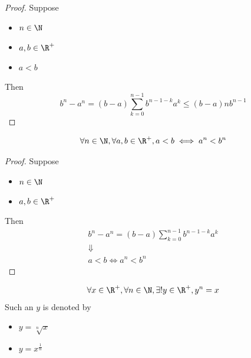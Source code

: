 \begin{proof}
  Suppose
  \begin{itemize}
    \item $n \in \N$
    \item $a, b \in \R^{+}$
    \item $ a < b$
  \end{itemize}
  Then
  \[
    b^{n} - a^{n} = (b - a)\sum_{k = 0}^{n - 1} b^{n - 1 - k} a^{k} \leq (b - a)nb^{n - 1}
  \]
\end{proof}

\bigskip

\begin{lemma} \label{an:lem:nth-power-is-monotone}
  \[
    \forall n \in \N, \forall a, b \in \R^{+}, a < b \iff a^{n} < b^{n}
  \]
\end{lemma}

\begin{proof}
  Suppose
  \begin{itemize}
    \item $n \in \N$
    \item $a, b \in \R^{+}$
  \end{itemize}
  Then
  \[
    \begin{array}{c}
      b^{n} - a^{n} = (b - a)\sum_{k = 0}^{n - 1} b^{n - 1 - k} a^{k} \\
      \Downarrow                                                      \\
      a < b \iff a^{n} < b^{n}
    \end{array}
  \]
\end{proof}

\bigskip

\begin{theorem} \label{an:thm:existence-and-uniqueness-of-nth-roots}
  \[
    \forall x \in \R^{+}, \forall n \in \N, \exists! y \in \R^{+}, y^{n} = x
  \]
  Such an $y$ is denoted by
  \begin{itemize}
    \item $y = \sqrt[n]{x}$
    \item $y = x^{\frac{1}{n}}$
  \end{itemize}
\end{theorem}

